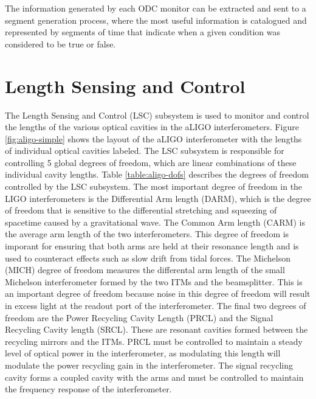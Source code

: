The information generated by each ODC monitor can be extracted and sent to a segment
generation process, where the most useful information is catalogued and represented by
segments of time that indicate when a given condition was considered to be true or false.

\section{Length Sensing and Control}

The Length Sensing and Control (LSC) subsystem is 
used to monitor and control the lengths of the various optical cavities in the 
aLIGO interferometers. Figure \ref{fig:aligo-simple} shows the layout 
of the aLIGO interferometer with the lengths of individual optical cavities 
labeled. 
The LSC subsystem is responsible for controlling 5 global degrees of freedom, 
which are linear combinations of these individual cavity lengths. Table 
\ref{table:aligo-dofs}  
describes the degrees of freedom controlled by the LSC subsystem. 
The most important degree of freedom in the LIGO interferometers is the Differential 
Arm length (DARM), which is the degree of freedom that is sensitive to the differential 
stretching and squeezing of spacetime caused by a gravitational wave. The Common Arm length 
(CARM) is the average arm length of the two interferometers. This degree of freedom is 
imporant for ensuring that both arms are held at their resonance length and is used to 
counteract effects such as slow drift from tidal forces. The Michelson (MICH) degree of 
freedom measures the differental arm length of the small Michelson interferometer formed 
by the two ITMs and the beamsplitter. This is an important degree of freedom because 
noise in this degree of freedom will result in excess light at the readout port of the 
interferometer. The final two degrees of freedom are the Power Recycling Cavity Length 
(PRCL) and the Signal Recycling Cavity length (SRCL). These are resonant cavities formed 
between the recycling mirrors and the ITMs. PRCL must be controlled to maintain a steady 
level of optical power in the interferometer, as modulating this length will modulate 
the power recycling gain in the interferometer. The signal recycling cavity forms a coupled 
cavity with the arms and must be controlled to maintain the 
frequency response of the interferometer. 

